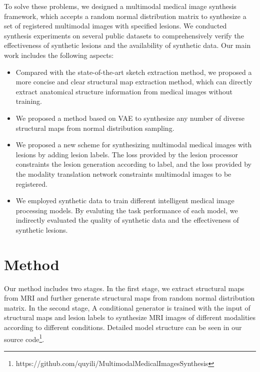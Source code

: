 \documentclass[runningheads]{llncs}
\begin{document}
	To solve these problems, we designed a multimodal medical image synthesis framework, which accepts a random normal distribution matrix to synthesize a set of registered multimodal images with specified lesions. We conducted synthesis experiments on several public datasets to comprehensively verify the effectiveness of synthetic lesions and the availability of synthetic data. Our main work includes the following aspects:
	\begin{itemize}
		\item Compared with the state-of-the-art sketch extraction method, we proposed a more concise and clear structural map extraction method, which can directly extract anatomical structure information from medical images without training.
		\item We proposed a method based on VAE to synthesize any number of diverse structural maps from normal distribution sampling.
		\item We proposed a new scheme for synthesizing multimodal medical images with lesions by adding lesion labels. The loss provided by the lesion processor constraints the lesion generation according to label, and the loss provided by the modality translation network constraints multimodal images to be registered.
		\item We employed synthetic data to train different intelligent medical image processing models. By evaluting the task performance of each model, we indirectly evaluated the quality of synthetic data and the effectiveness of synthetic lesions.
	\end{itemize}
	
	\section{Method}
	\label{method}
	Our method includes two stages. In the first stage, we extract structural maps from MRI and further generate structural maps from random normal distribution matrix. In the second stage, A conditional generator is trained with the input of structural maps and lesion labels to synthesize MRI images of different modalities according to different conditions. Detailed model structure can be seen in our source code\footnote{https://github.com/quyili/MultimodalMedicalImagesSynthesis}.
	
\end{document}
